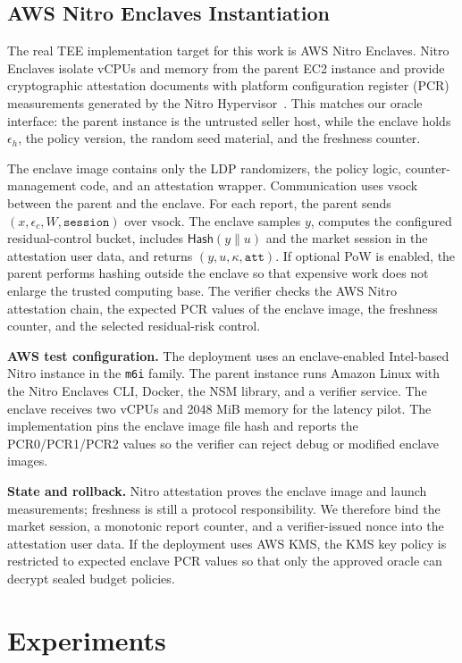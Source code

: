 \documentclass[conference]{IEEEtran}
\newcommand{\eps}{\epsilon}
\begin{document}
\subsection{AWS Nitro Enclaves Instantiation}

The real TEE implementation target for this work is AWS Nitro Enclaves. Nitro Enclaves isolate vCPUs and memory from the parent EC2 instance and provide cryptographic attestation documents with platform configuration register (PCR) measurements generated by the Nitro Hypervisor~\cite{awsnitro,awsattest}. This matches our oracle interface: the parent instance is the untrusted seller host, while the enclave holds $\eps_h$, the policy version, the random seed material, and the freshness counter.

The enclave image contains only the LDP randomizers, the policy logic, counter-management code, and an attestation wrapper. Communication uses vsock between the parent and the enclave. For each report, the parent sends $(x,\eps_c,W,\texttt{session})$ over vsock. The enclave samples $y$, computes the configured residual-control bucket, includes $\mathsf{Hash}(y\|u)$ and the market session in the attestation user data, and returns $(y,u,\kappa,\texttt{att})$. If optional PoW is enabled, the parent performs hashing outside the enclave so that expensive work does not enlarge the trusted computing base. The verifier checks the AWS Nitro attestation chain, the expected PCR values of the enclave image, the freshness counter, and the selected residual-risk control.

\textbf{AWS test configuration.} The deployment uses an enclave-enabled Intel-based Nitro instance in the \texttt{m6i} family. The parent instance runs Amazon Linux with the Nitro Enclaves CLI, Docker, the NSM library, and a verifier service. The enclave receives two vCPUs and 2048 MiB memory for the latency pilot. The implementation pins the enclave image file hash and reports the PCR0/PCR1/PCR2 values so the verifier can reject debug or modified enclave images.

\textbf{State and rollback.} Nitro attestation proves the enclave image and launch measurements; freshness is still a protocol responsibility. We therefore bind the market session, a monotonic report counter, and a verifier-issued nonce into the attestation user data. If the deployment uses AWS KMS, the KMS key policy is restricted to expected enclave PCR values so that only the approved oracle can decrypt sealed budget policies.


\section{Experiments}
\label{sec:experiments}
\end{document}
